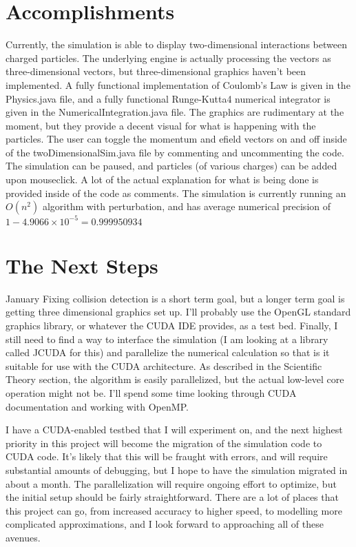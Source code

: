 \documentclass[10pt]{article}
\begin{document}
\clearpage
\section{Accomplishments}
Currently, the simulation is able to display two-dimensional interactions between charged particles. The underlying engine is actually processing the vectors as three-dimensional vectors, but three-dimensional graphics haven't been implemented. A fully functional implementation of Coulomb's Law is given in the Physics.java file, and a fully functional Runge-Kutta4 numerical integrator is given in the NumericalIntegration.java file. The graphics are rudimentary at the moment, but they provide a decent visual for what is happening with the particles. The user can toggle the momentum and efield vectors on and off inside of the twoDimensionalSim.java file by commenting and uncommenting the code. The simulation can be paused, and particles (of various charges) can be added upon mouseclick. A lot of the actual explanation for what is being done is provided inside of the code as comments. The simulation is currently running an $O(n^2)$ algorithm with perturbation, and has average numerical precision of $1 - 4.9066 \times 10^{-5} = 0.999950934$

\section{The Next Steps}
January
Fixing collision detection is a short term goal, but a longer term goal is getting three dimensional graphics set up. I'll probably use the OpenGL standard graphics library, or whatever the CUDA IDE provides, as a test bed. Finally, I still need to find a way to interface the simulation (I am looking at a library called JCUDA for this) and parallelize the numerical calculation so that is it suitable for use with the CUDA architecture. As described in the Scientific Theory section, the algorithm is easily parallelized, but the actual low-level core operation might not be. I'll spend some time looking through CUDA documentation and working with OpenMP. 

I have a CUDA-enabled testbed that I will experiment on, and the next highest priority in this project will become the migration of the simulation code to CUDA code. It's likely that this will be fraught with errors, and will require substantial amounts of debugging, but I hope to have the simulation migrated in about a month. The parallelization will require ongoing effort to optimize, but the initial setup should be fairly straightforward. There are a lot of places that this project can go, from increased accuracy to higher speed, to modelling more complicated approximations, and I look forward to approaching all of these avenues.
\end{document}
